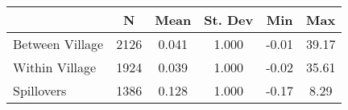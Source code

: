 \begin{tabular}{l*{5}{c}}\hline&\multicolumn{1}{c}{N}&\multicolumn{1}{c}{Mean}&\multicolumn{1}{c}{St. Dev}&\multicolumn{1}{c}{Min}&\multicolumn{1}{c}{Max}\\ \hline 
Between Village & 2126 & 0.041 & 1.000 & -0.01 & 39.17 \\
Within Village & 1924 & 0.039 & 1.000 & -0.02 & 35.61 \\
Spillovers & 1386 & 0.128 & 1.000 & -0.17 & 8.29 \\
\hline \end{tabular}

